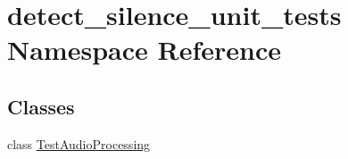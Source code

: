 \hypertarget{namespacedetect__silence__unit__tests}{\section{detect\-\_\-silence\-\_\-unit\-\_\-tests Namespace Reference}
\label{namespacedetect__silence__unit__tests}
}
\subsection*{Classes}
\begin{DoxyCompactItemize}
\item 
class \hyperlink{classdetect__silence__unit__tests_1_1TestAudioProcessing}{Test\-Audio\-Processing}
\end{DoxyCompactItemize}
